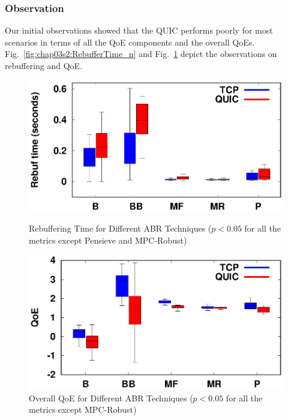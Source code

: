 \subsubsection{Observation}
Our initial observations showed that the QUIC performs poorly for most scenarios in terms of all the QoE components and the overall QoEs. Fig.~\ref{fig:chap03s2:RebufferTime_n} and Fig.~\ref{fig:chap03s2:QOE_n} depict the observations on rebuffering and QoE.

\begin{figure}[!h]
%	
	\begin{minipage}[t]{0.48\linewidth}
		\includegraphics[width=\linewidth]{img/QUIC/rebuf_box}
		\caption{\label{fig:chap03s2:RebufferTime_n}Rebuffering Time for Different ABR Techniques ($p<0.05$ for all the metrics except Pensieve and MPC-Robust)}
	\end{minipage}\hfill
	\begin{minipage}[t]{0.48\linewidth}
		\includegraphics[width=\linewidth]{img/QUIC/qoe_box}
		\caption{\label{fig:chap03s2:QOE_n}Overall QoE for Different ABR Techniques ($p<0.05$ for all the metrics except MPC-Robust)}
	\end{minipage}
\end{figure}


